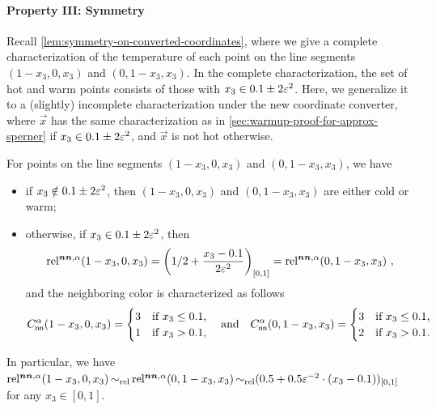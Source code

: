 \paragraph{Property III: Symmetry} Recall \cref{lem:symmetry-on-converted-coordinates}, where we give a complete characterization of the temperature of each point on the line segments $(1-x_3,0,x_3)$ and $(0,1-x_3,x_3)$.
In the complete characterization, the set of hot and warm points consists of those with $x_3\in 0.1\pm 2\varepsilon^2$. 
Here, we generalize it to a (slightly) incomplete characterization under the new coordinate converter, where $\vec{x}$ has the same characterization as in \cref{sec:warmup-proof-for-approx-sperner} if $x_3\in 0.1\pm 2\varepsilon^2$, and $\vec{x}$ is not hot otherwise.
\begin{lemma}
    \label{lem:symmetry-on-converted-coordinates-for-symmetric-sperner}
    For points on the line segments $(1-x_3, 0,x_3)$ and $(0, 1-x_3,x_3)$, we have 
    \begin{itemize}[itemsep=0.2em, topsep=0.5em]
        \item if $x_3\notin 0.1\pm 2\varepsilon^2$, then $(1-x_3,0,x_3)$ and $(0,1-x_3,x_3)$ are either cold or warm;
        \item otherwise, if $x_3\in 0.1\pm 2\varepsilon^2$, then
        \begin{align}
            \label{eqn:stronger-symmetry-on-converted-coordinates-for-symmetry}
            \operatorname*{rel^{\boldsymbol{nn},\alpha}}(1-x_3, 0,x_3) = \left(1/2 + \frac{x_3-0.1}{2 \varepsilon^2}\right)_{[0,1]} =\operatorname*{rel^{\boldsymbol{nn},\alpha}}(0, 1-x_3, x_3)~,
        \end{align}
        and the neighboring color is characterized as follows
        \begin{align*}
            C^\alpha_{\sf nn}(1-x_3,0,x_3) = \begin{cases}
                3 & \text{if $x_3\leq 0.1$,}\\
                1 & \text{if $x_3>0.1$,}
            \end{cases}
            \quad
            \text{and}
            \quad
            C^\alpha_{\sf nn}(0,1-x_3,x_3) = \begin{cases}
                3 & \text{if $x_3\leq 0.1$,}\\
                2 & \text{if $x_3>0.1$.}
            \end{cases}
        \end{align*}
    \end{itemize}
    In particular, we have $\operatorname*{rel^{\boldsymbol{nn},\alpha}}(1-x_3,0,x_3) \operatorname*{\sim_{\rm rel}} \operatorname*{rel^{\boldsymbol{nn},\alpha}}(0,1-x_3,x_3) \operatorname*{\sim_{\rm rel}} (0.5+0.5\varepsilon^{-2}\cdot (x_3-0.1))_{[0,1]}$ for any $x_3\in [0,1]$.
\end{lemma}


